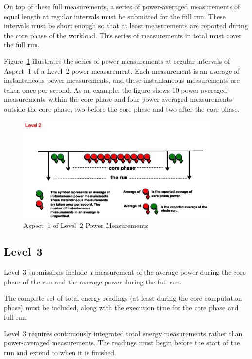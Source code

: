 On top of these full measurements, a series of power-averaged measurements of equal length at regular intervals must be submitted for the full run.
These intervals must be short enough so that at least \MinMeasurementsCorePhaseLTwoThree{} measurements are reported during the core phase of the workload.
This series of measurements in total must cover the full run.

Figure~\ref{fig:a1l2pm} illustrates the series of power measurements at regular intervals of Aspect~1 of a Level~2 power measurement.
Each measurement is an average of instantaneous power measurements, and these instantaneous measurements are taken once per second.
As an example, the figure shows \num{10} power-averaged measurements within the core phase and four power-averaged measurements outside the core phase, two before the core phase and two after the core phase.

\begin{figure}
\centering
\includegraphics[width=4in]{fig3-4}
\caption{Aspect~1 of Level~2 Power Measurements}
\label{fig:a1l2pm}
\end{figure}

\subsection{Level~3}

Level~3 submissions include a measurement of the average power during the core phase of the run and the average power during the full run.

The complete set of total energy readings (at least \MinMeasurementsCorePhaseLTwoThree{} during the core computation phase) must be included, along with the execution time for the core phase and full run.

Level~3 requires continuously integrated total energy measurements rather than power-averaged measurements.
The readings must begin before the start of the run and extend to when it is finished.

